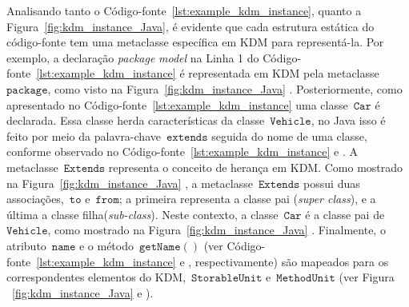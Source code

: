Analisando tanto o Código-fonte~\ref{lst:example_kdm_instance}, quanto a Figura~\ref{fig:kdm_instance_Java}, é evidente que cada estrutura estática do código-fonte tem uma metaclasse específica em KDM para representá-la. Por exemplo, a declaração \textit{package} \textit{model} na Linha 1 do Código-fonte~\ref{lst:example_kdm_instance}  é representada em KDM pela metaclasse ~$\mathtt{package}$, como visto na Figura~\ref{fig:kdm_instance_Java} . Posteriormente, como apresentado no Código-fonte~\ref{lst:example_kdm_instance}  uma classe~$\mathtt{Car}$ é declarada. Essa classe herda características da classe~$\mathtt{Vehicle}$, no Java isso é feito por meio da palavra-chave~$\mathtt{extends}$ seguida do nome de uma classe, conforme observado no Código-fonte~\ref{lst:example_kdm_instance}  e . A metaclasse~$\mathtt{Extends}$ representa o conceito de herança em KDM. Como mostrado na Figura~\ref{fig:kdm_instance_Java} , a metaclasse~$\mathtt{Extends}$ possui duas associações,~$\mathtt{to}$ e~$\mathtt{from}$; a primeira representa a classe pai (\textit{super class}), e a última a classe filha(\textit{sub-class}). Neste contexto, a classe~$\mathtt{Car}$ é a classe pai de~$\mathtt{Vehicle}$, como mostrado na Figura~\ref{fig:kdm_instance_Java} . Finalmente, o atributo~$\mathtt{name}$ e o método~$\mathtt{getName()}$ (ver Código-fonte~\ref{lst:example_kdm_instance}  e , respectivamente) são mapeados para os correspondentes elementos do KDM,~$\mathtt{StorableUnit}$ e~$\mathtt{MethodUnit}$ (ver Figura ~\ref{fig:kdm_instance_Java}  e ). 
%
